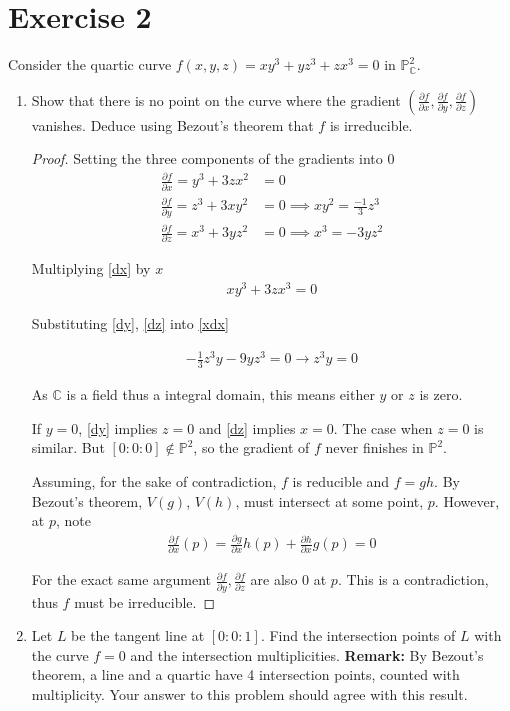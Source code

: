 \documentclass{article}
\theoremstyle{definition}
\theoremstyle{definition}
\theoremstyle{remark}
\newcommand{\bb}[1]{\mathbb{#1}} %
\begin{document}
\section*{Exercise 2}
Consider the quartic curve \(f(x, y, z) = xy^3 + yz^3 + zx^3 = 0\) in \(\mathbb{P}^2_\mathbb{C}\).

\begin{enumerate}
    \item Show that there is no point on the curve where the gradient \(\left(\frac{\partial f}{\partial x}, \frac{\partial f}{\partial y}, \frac{\partial f}{\partial z}\right)\) vanishes. Deduce using Bezout's theorem that \(f\) is irreducible.

	\begin{proof}
		Setting the three components of the gradients into 0
		\begin{align}
			\label{dx}
			\frac{\partial f}{\partial x} = y^3 + 3zx^2	 &= 0\\
			\label{dy}
			\frac{\partial f}{\partial y} = z^3 + 3xy^2	&= 0 \implies xy^2 = \frac{-1}{3}z^3\\
			\label{dz}
			\frac{\partial f}{\partial z} = x^3 + 3yz^2	 &= 0 \implies x^3 = -3yz^2
		\end{align}

	Multiplying \ref{dx} by $x$
	\begin{align}\label{xdx}
		xy^3 + 3zx^3 = 0	
	\end{align}

	Substituting \ref{dy}, \ref{dz} into \ref{xdx}

	\begin{align}
		-\frac{1}{3}z^3 y - 9 yz^3 = 0 \rightarrow z^3y = 0	
	\end{align}

	As $\bb{C}$ is a field thus a integral domain, this means either $y$ or $z$ is zero. 

	If $y = 0$, \ref{dy} implies $z = 0$ and \ref{dz} implies $x = 0$. 
	The case when $z = 0$ is similar. 
	But $[0:0:0] \notin \bb{P}^2$, so the gradient of $f$ never finishes in $\bb{P}^2$.

	Assuming, for the sake of contradiction, $f$ is reducible and $f = gh$.
	By Bezout's theorem, $V(g)$, $V(h)$, must intersect at some point, $p$. 
	However, at $p$, note 
	\begin{align}
		\frac{\partial f}{\partial x} (p) = \frac{\partial g}{\partial x}h(p) +  \frac{\partial h}{\partial x}g(p) = 0
	\end{align}

	For the exact same argument $\frac{\partial f}{\partial y}, \frac{\partial f}{\partial z}$ are also $0$ at $p$. 
	This is a contradiction, thus $f$ must be irreducible.
	
	\end{proof}
    
    \item Let \(L\) be the tangent line at \([0 : 0 : 1]\). Find the intersection points of \(L\) with the curve \(f = 0\) and the intersection multiplicities. \textbf{Remark:} By Bezout's theorem, a line and a quartic have 4 intersection points, counted with multiplicity. Your answer to this problem should agree with this result.
\end{enumerate}
\end{document}
